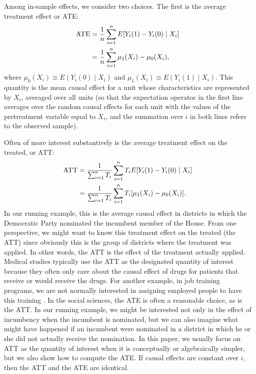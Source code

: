 \documentclass[11pt,titlepage]{article}
\begin{document}
Among in-sample effects, we consider two choices.  The first is the
average treatment effect or ATE:
\begin{align}
  \label{pate}
  \text{ATE} & = \frac{1}{n}\sum_{i=1}^n E[Y_i(1) - Y_i(0)\mid X_i] \notag\\
  &  = \frac{1}{n}\sum_{i=1}^n \mu_1(X_i) - \mu_0(X_i),
\end{align}
where $\mu_0(X_i)\equiv E(Y_i(0)\mid X_i)$ and $\mu_1(X_i)\equiv
E(Y_i(1)\mid X_i)$. This quantity is the mean causal effect for a unit
whose characteristics are represented by $X_i$, averaged over all
units (so that the expectation operator in the first line averages
over the random causal effects for each unit with the values of the
pretreatment variable equal to $X_i$, and the summation over $i$ in
both lines refers to the observed sample).

Often of more interest substantively is the average treatment effect
on the treated, or ATT:
\begin{align}
  \label{att}
  \text{ATT} & = \frac{1}{\sum_{i=1}^n T_i}\sum_{i=1}^n T_i E[Y_i(1) -
  Y_i(0)\mid X_i]\notag\\ 
  & = \frac{1}{\sum_{i=1}^n T_i}\sum_{i=1}^n T_i[\mu_1(X_i) - \mu_0(X_i)].
\end{align}
In our running example, this is the average causal effect in districts
in which the Democratic Party nominated the incumbent member of the
House.  From one perspective, we might want to know this treatment
effect on the treated (the ATT) since obviously this is the group of
districts where the treatment was applied.  In other words, the ATT is
the effect of the treatment actually applied.  Medical studies
typically use the ATT as the designated quantity of interest because
they often only care about the causal effect of drugs for patients
that receive or would receive the drugs.  For another example, in job
training programs, we are not normally interested in assigning
employed people to have this training \citep{HecIchTod98}.  In the
social sciences, the ATE is often a reasonable choice, as is the ATT.
In our running example, we might be interested not only in the effect
of incumbency when the incumbent is nominated, but we can also imagine
what might have happened if an incumbent were nominated in a district
in which he or she did not actually receive the nomination.  In this
paper, we usually focus on ATT as the quantity of interest when it is
conceptually or algebraically simpler, but we also show how to compute
the ATE.  If causal effects are constant over $i$, then the ATT and
the ATE are identical.
\end{document}
